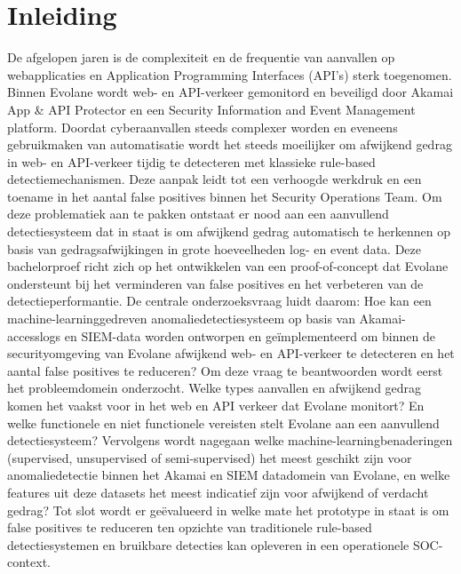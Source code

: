 


% 

\section{Inleiding}%
\label{sec:inleiding}

De afgelopen jaren is de complexiteit en de frequentie van aanvallen op webapplicaties en Application Programming Interfaces (API's) sterk toegenomen. Binnen Evolane wordt web- en API-verkeer gemonitord en beveiligd door Akamai App & API Protector en een Security Information and Event Management platform. Doordat cyberaanvallen steeds complexer worden en eveneens gebruikmaken van automatisatie wordt het steeds moeilijker om afwijkend gedrag in web- en API-verkeer tijdig te detecteren met klassieke rule-based detectiemechanismen. Deze aanpak leidt tot een verhoogde werkdruk en een toename in het aantal false positives binnen het Security Operations Team. Om deze problematiek aan te pakken ontstaat er nood aan een aanvullend detectiesysteem dat in staat is om afwijkend gedrag automatisch te herkennen op basis van gedragsafwijkingen in grote hoeveelheden log- en event data. Deze bachelorproef richt zich op het ontwikkelen van een proof-of-concept dat Evolane ondersteunt bij het verminderen van false positives en het verbeteren van de detectieperformantie. De centrale onderzoeksvraag luidt daarom: Hoe kan een machine-learninggedreven anomaliedetectiesysteem op basis van Akamai-accesslogs en SIEM-data worden ontworpen en geïmplementeerd om binnen de securityomgeving van Evolane afwijkend web- en API-verkeer te detecteren en het aantal false positives te reduceren? Om deze vraag te beantwoorden wordt eerst het probleemdomein onderzocht. Welke types aanvallen en afwijkend gedrag komen het vaakst voor in het web en API verkeer dat Evolane monitort? En welke functionele en niet functionele vereisten stelt Evolane aan een aanvullend detectiesysteem? Vervolgens wordt nagegaan welke machine-learningbenaderingen (supervised, unsupervised of semi-supervised) het meest geschikt zijn voor anomaliedetectie binnen het Akamai en SIEM datadomein van Evolane, en welke features uit deze datasets het meest indicatief zijn voor afwijkend of verdacht gedrag? Tot slot wordt er geëvalueerd in welke mate het prototype in staat is om false positives te reduceren ten opzichte van traditionele rule-based detectiesystemen en bruikbare detecties kan opleveren in een operationele SOC-context. 

